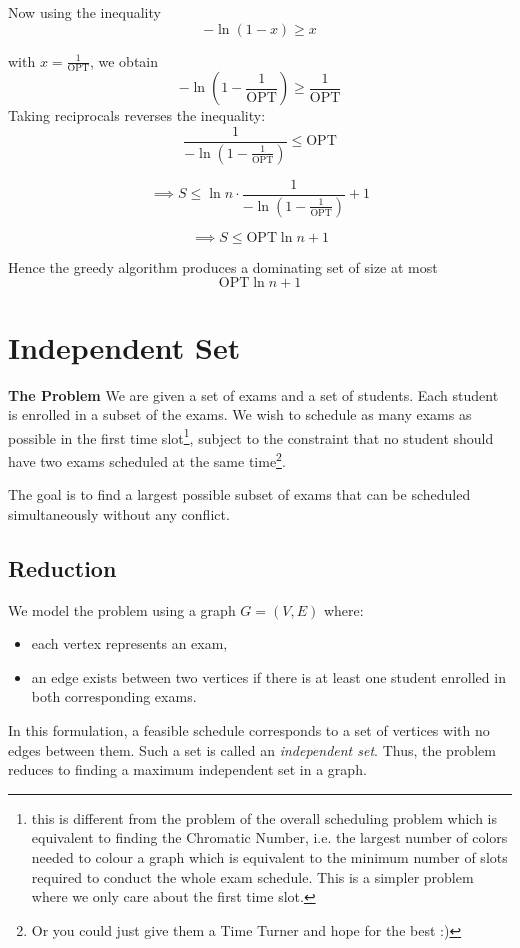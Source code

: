 Now using the inequality
\[
-\ln(1-x)\ge x
\]

with \(x=\frac1{\mathrm{OPT}}\), we obtain
\[
-\ln\left(1-\frac1{\mathrm{OPT}}\right)
\ge
\frac1{\mathrm{OPT}}
\]
\vspace{0.4em}
Taking reciprocals reverses the inequality:
\[
\frac1{
-\ln\left(1-\frac1{\mathrm{OPT}}\right)
}
\le
\mathrm{OPT}
\]

\[
\implies
S
\le
\ln n\cdot
\frac1{
-\ln\left(1-\frac1{\mathrm{OPT}}\right)
}
+1
\]

\[
\implies
S
\le
\mathrm{OPT}\ln n+1
\]

Hence the greedy algorithm produces a dominating set of size at most
\[
\boxed{
\mathrm{OPT}\ln n+1
}
\]

\section{Independent Set}

\textbf{The Problem}
We are given a set of exams and a set of students. Each student is enrolled in a subset of the exams. 
We wish to schedule as many exams as possible in the first time slot\footnote{this is different
from the problem of the overall scheduling problem which is equivalent to finding the Chromatic Number, 
i.e. the largest number of colors needed to colour a graph which is equivalent to the minimum number 
of slots required to conduct the whole exam schedule. 
This is a simpler problem where we only care about the first time slot.}, 
subject to the constraint that no student should have two exams scheduled at the 
same time\footnote{Or you could just give them a Time Turner and hope for the best :)}.

The goal is to find a largest possible subset of exams that can be scheduled simultaneously without any conflict.

\subsection*{Reduction}

We model the problem using a graph \(G=(V,E)\) where:
\begin{itemize}
    \item each vertex represents an exam,
    \item an edge exists between two vertices if there is at least one student enrolled in both corresponding exams.
\end{itemize}

In this formulation, a feasible schedule corresponds to a set of vertices with no edges between them. Such a set is called an \emph{independent set}.
Thus, the problem reduces to finding a maximum independent set in a graph.

